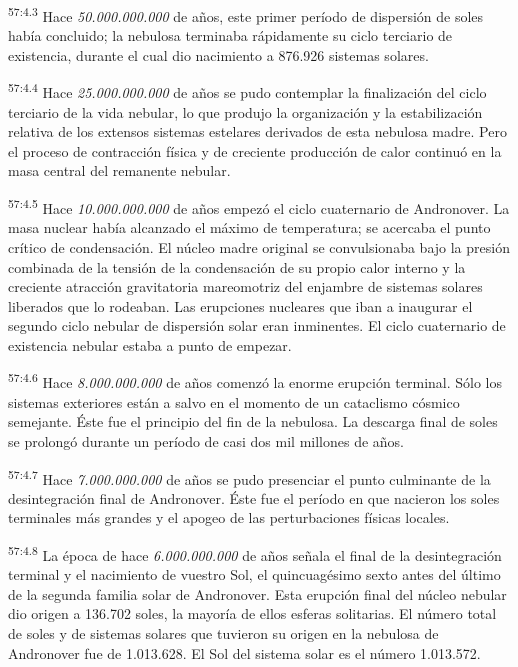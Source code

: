 \par
\textsuperscript{57:4.3} Hace \textit{50.000.000.000} de años, este primer período de dispersión de soles había concluido; la nebulosa terminaba rápidamente su ciclo terciario de existencia, durante el cual dio nacimiento a 876.926 sistemas solares.

\par
\textsuperscript{57:4.4} Hace \textit{25.000.000.000} de años se pudo contemplar la finalización del ciclo terciario de la vida nebular, lo que produjo la organización y la estabilización relativa de los extensos sistemas estelares derivados de esta nebulosa madre. Pero el proceso de contracción física y de creciente producción de calor continuó en la masa central del remanente nebular.

\par
\textsuperscript{57:4.5} Hace \textit{10.000.000.000} de años empezó el ciclo cuaternario de Andronover. La masa nuclear había alcanzado el máximo de temperatura; se acercaba el punto crítico de condensación. El núcleo madre original se convulsionaba bajo la presión combinada de la tensión de la condensación de su propio calor interno y la creciente atracción gravitatoria mareomotriz del enjambre de sistemas solares liberados que lo rodeaban. Las erupciones nucleares que iban a inaugurar el segundo ciclo nebular de dispersión solar eran inminentes. El ciclo cuaternario de existencia nebular estaba a punto de empezar.

\par
\textsuperscript{57:4.6} Hace \textit{8.000.000.000} de años comenzó la enorme erupción terminal. Sólo los sistemas exteriores están a salvo en el momento de un cataclismo cósmico semejante. Éste fue el principio del fin de la nebulosa. La descarga final de soles se prolongó durante un período de casi dos mil millones de años.

\par
\textsuperscript{57:4.7} Hace \textit{7.000.000.000} de años se pudo presenciar el punto culminante de la desintegración final de Andronover. Éste fue el período en que nacieron los soles terminales más grandes y el apogeo de las perturbaciones físicas locales.

\par
\textsuperscript{57:4.8} La época de hace \textit{6.000.000.000} de años señala el final de la desintegración terminal y el nacimiento de vuestro Sol, el quincuagésimo sexto antes del último de la segunda familia solar de Andronover. Esta erupción final del núcleo nebular dio origen a 136.702 soles, la mayoría de ellos esferas solitarias. El número total de soles y de sistemas solares que tuvieron su origen en la nebulosa de Andronover fue de 1.013.628. El Sol del sistema solar es el número 1.013.572.


